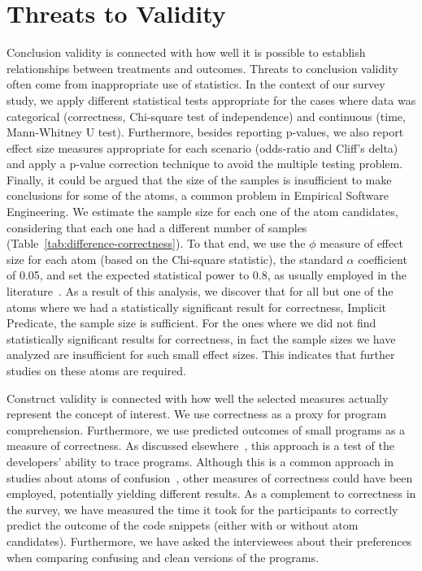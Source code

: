 \section{Threats to Validity}
\label{threat}

Conclusion validity is connected with how well it is possible to establish relationships between treatments and outcomes. Threats to conclusion validity often come from inappropriate use of statistics. In the context of our survey study, we apply different statistical tests appropriate for the cases where data was categorical (correctness, Chi-square test of independence) and continuous (time, Mann-Whitney U test). Furthermore, besides reporting p-values, we also report effect size measures appropriate for each scenario (odds-ratio and Cliff's delta) and apply a p-value correction technique to avoid the multiple testing problem. Finally, it could be argued that the size of the samples is insufficient to make conclusions for some of the atoms, a common problem in Empirical Software Engineering. We estimate the sample size for each one of the atom candidates, considering that each one had a different number of samples (Table~\ref{tab:difference-correctness}). To that end, we use the $\phi$ measure of effect size for each atom (based on the Chi-square statistic), the standard $\alpha$ coefficient of 0.05, and set the expected statistical power to 0.8, as usually employed in the literature~\cite{Ellis:2010:EGE}. As a result of this analysis, we discover that for all but one of the atoms where we had a statistically significant result for correctness, Implicit Predicate, the sample size is sufficient. For the ones where we did not find statistically significant results for correctness, in fact the sample sizes we have analyzed are insufficient for such small effect sizes. This indicates that further studies on these atoms are required.


Construct validity is connected with how well the selected measures actually represent the concept of interest. We use correctness as a proxy for program comprehension. Furthermore, we use predicted outcomes of small programs as a measure of correctness. As discussed elsewhere~\cite{Oliveira:2020:ECR}, this approach is a test of the developers' ability to trace programs. Although this is a common approach in studies about atoms of confusion~\cite{TheEyesDoNotLie,Langhout:2021:ACJ,DBLP:conf/sigsoft/GopsteinIYDZYC17}, other measures of correctness could have been employed, potentially yielding different results. As a complement to correctness in the survey, we have measured the time it took for the participants to correctly predict the outcome of the code snippets (either with or without atom candidates). Furthermore, we have  asked the interviewees about their preferences when comparing confusing and clean versions of the programs.

